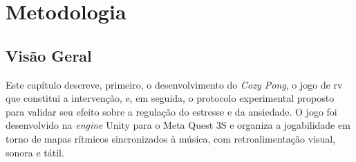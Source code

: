 \chapter{Metodologia}\label{cap:metodologia}
\glsresetall

%

\section{Visão Geral}\label{sec:visao-geral}

Este capítulo descreve, primeiro, o desenvolvimento do \textit{Cozy Pong}, o jogo de \gls{rv} que constitui a intervenção, e, em seguida, o protocolo experimental proposto para validar seu efeito sobre a regulação do estresse e da ansiedade. O jogo foi desenvolvido na \textit{engine} Unity para o Meta Quest 3S e organiza a jogabilidade em torno de mapas rítmicos sincronizados à música, com retroalimentação visual, sonora e tátil.

